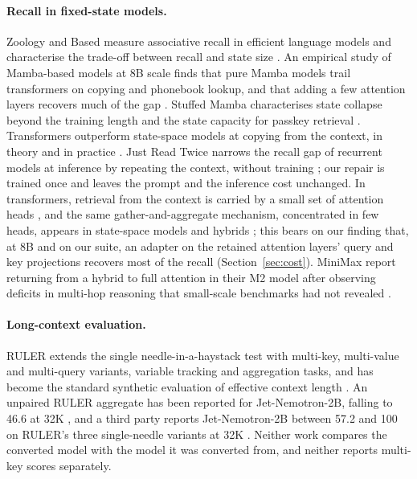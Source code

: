 \documentclass[11pt]{article}
\begin{document}
\paragraph{Recall in fixed-state models.} Zoology and Based measure associative recall in efficient language models and characterise the trade-off between recall and state size \citep{zoology2023,based2024}. An empirical study of Mamba-based models at 8B scale finds that pure Mamba models trail transformers on copying and phonebook lookup, and that adding a few attention layers recovers much of the gap \citep{waleffe2024}. Stuffed Mamba characterises state collapse beyond the training length and the state capacity for passkey retrieval \citep{stuffedmamba2024}. Transformers outperform state-space models at copying from the context, in theory and in practice \citep{jelassi2024}. Just Read Twice narrows the recall gap of recurrent models at inference by repeating the context, without training \citep{justreadtwice2024}; our repair is trained once and leaves the prompt and the inference cost unchanged. In transformers, retrieval from the context is carried by a small set of attention heads \citep{retrievalheads2024}, and the same gather-and-aggregate mechanism, concentrated in few heads, appears in state-space models and hybrids \citep{bick2025}; this bears on our finding that, at 8B and on our suite, an adapter on the retained attention layers' query and key projections recovers most of the recall (Section~\ref{sec:cost}). MiniMax report returning from a hybrid to full attention in their M2 model after observing deficits in multi-hop reasoning that small-scale benchmarks had not revealed \citep{minimaxm2_2025}.

\paragraph{Long-context evaluation.} RULER extends the single needle-in-a-haystack test with multi-key, multi-value and multi-query variants, variable tracking and aggregation tasks, and has become the standard synthetic evaluation of effective context length \citep{ruler2024}. An unpaired RULER aggregate has been reported for Jet-Nemotron-2B, falling to 46.6 at 32K \citep{jetlong2026}, and a third party reports Jet-Nemotron-2B between 57.2 and 100 on RULER's three single-needle variants at 32K \citep{attentionamnesia2026}. Neither work compares the converted model with the model it was converted from, and neither reports multi-key scores separately.
\end{document}
